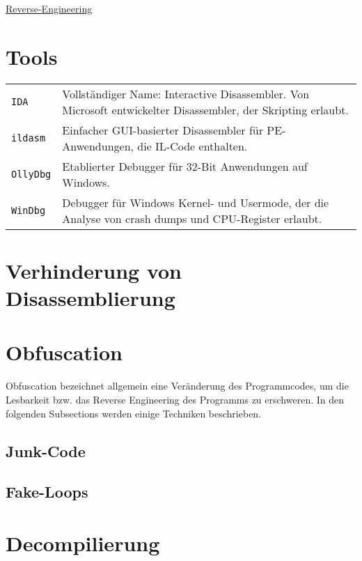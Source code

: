 \raggedright
\footnotesize
\begin{multicols}{3}	
	\setlength{\premulticols}{1pt}
	\setlength{\postmulticols}{1pt}
	\setlength{\multicolsep}{1pt}
	\setlength{\columnsep}{2pt}

\begin{center}
     \Large{\underline{Reverse-Engineering}} \\
\end{center}

\section{Tools}
\begin{tabular}{@{}p{\the\MyLen}
		@{}p{\linewidth-\the\MyLen}@{}}
	\texttt{IDA} &  Vollständiger Name: Interactive Disassembler. Von Microsoft entwickelter Disassembler, der Skripting erlaubt. \\
	\texttt{ildasm} & Einfacher GUI-basierter Disassembler für PE-Anwendungen, die IL-Code enthalten.\\
	\texttt{OllyDbg} & Etablierter Debugger für 32-Bit Anwendungen auf Windows.\\
	\texttt{WinDbg} & Debugger für Windows Kernel- und Usermode, der die Analyse von crash dumps und CPU-Register erlaubt.\\
\end{tabular}
\lipsum
\section{Verhinderung von Disassemblierung}
\lipsum
\section{Obfuscation}
Obfuscation bezeichnet allgemein eine Veränderung des Programmcodes, um die Lesbarkeit bzw. das Reverse Engineering des Programms zu erschweren. In den folgenden Subsections werden einige Techniken beschrieben.
\subsection{Junk-Code}
\lipsum
\subsection{Fake-Loops}
\lipsum
\section{Decompilierung}
\lipsum
\end{multicols}